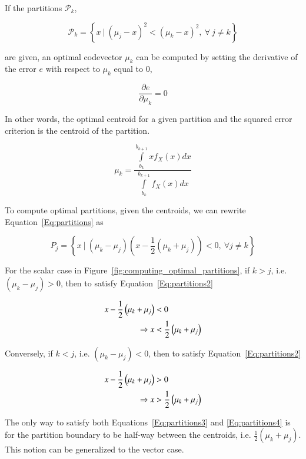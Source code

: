 \begin{Body}
If the partitions $\mathcal{P}_k$,

\begin{equation}
\label{Eq:partitions}
\mathcal{P}_k =  \left\{x \ | \ (\mu_j-x)^2 < (\mu_k-x)^2, \ \forall \ j \neq k \right\}
\end{equation}

are given, an optimal codevector $\mu_k$ can be computed by setting the derivative of the error $e$ with respect to $\mu_k$ equal to 0,

\begin{equation}
\frac{\partial{e}}{\partial{\mu_k}} = 0
\end{equation}

In other words, the optimal centroid for a given partition and the squared error criterion is the centroid of the partition. 

\begin{equation}
\mu_k = \frac
{\int\limits_{b_k}^{b_{k+1}}xf_X(x)dx}
{\int\limits_{b_k}^{b_{k+1}}f_X(x)dx}
\end{equation}

To compute optimal partitions, given the centroids, we can rewrite Equation~\ref{Eq:partitions} as 

\begin{equation}
\label{Eq:partitions2}
P_j=\left\{x \ | \ (\mu_k -\mu_j) \left(x - \frac{1}{2} \left(\mu_k + \mu_j \right)\right) < 0, \ \forall j \neq k 
\right\}
\end{equation}

For the scalar case in Figure~\ref{fig:computing_optimal_partitions}, if $k>j$, i.e. $(\mu_k -\mu_j) > 0$, then to satisfy Equation~\ref{Eq:partitions2}

\begin{align}
\label{Eq:partitions3}
x - \frac{1}{2} \left(\mu_k + \mu_j \right) &< 0\notag\\
\Rightarrow x &< \frac{1}{2} \left(\mu_k + \mu_j \right)
\end{align}

Conversely, if $k<j$, i.e. $(\mu_k -\mu_j) < 0$, then to satisfy Equation~\ref{Eq:partitions2}

\begin{align}
\label{Eq:partitions4}
x - \frac{1}{2} \left(\mu_k + \mu_j \right) &> 0 \notag\\
\Rightarrow x &> \frac{1}{2} \left(\mu_k + \mu_j \right)
\end{align}

The only way to satisfy both Equations~\ref{Eq:partitions3} and \ref{Eq:partitions4} is for the partition boundary to be half-way between the centroids, i.e. $\frac{1}{2} \left(\mu_k + \mu_j \right)$.  This notion can be generalized to the vector case.


\end{Body}
